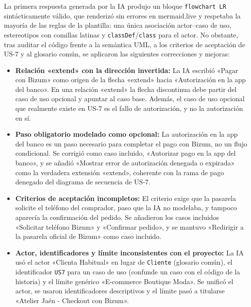 La primera respuesta generada por la IA produjo un bloque \texttt{flowchart LR} sintácticamente válido, que renderizó sin errores en mermaid.live y respetaba la mayoría de las reglas de la plantilla: una única asociación actor--caso de uso, estereotipos con comillas latinas y \texttt{classDef}/\texttt{class} para el actor. No obstante, tras auditar el código frente a la semántica UML, a los criterios de aceptación de US-7 y al glosario común, se aplicaron las siguientes correcciones y mejoras:
\begin{itemize}[leftmargin=*,nosep]
\item \textbf{Relación «extend» con la dirección invertida:} La IA escribió «Pagar con Bizum» como origen de la flecha «extend» hacia «Autorización en la app del banco». En una relación «extend» la flecha discontinua debe partir del caso de uso opcional y apuntar al caso base. Además, el caso de uso opcional que realmente existe en US-7 es el fallo de autorización, y no la autorización en sí.
\item \textbf{Paso obligatorio modelado como opcional:} La autorización en la app del banco es un paso necesario para completar el pago con Bizum, no un flujo condicional. Se corrigió como caso incluido, «Autorizar pago en la app del banco», y se añadió «Mostrar error de autorización denegada o expirada» como la verdadera extensión «extend», coherente con la rama de pago denegado del diagrama de secuencia de US-7.
\item \textbf{Criterios de aceptación incompletos:} El criterio exige que la pasarela solicite el teléfono del comprador, paso que la IA no modelaba, y tampoco aparecía la confirmación del pedido. Se añadieron los casos incluidos «Solicitar teléfono Bizum» y «Confirmar pedido», y se mantuvo «Redirigir a la pasarela oficial de Bizum» como caso incluido.
\item \textbf{Actor, identificadores y límite inconsistentes con el proyecto:} La IA usó el actor «Clienta Habitual» en lugar de \texttt{Cliente} (glosario común), el identificador \texttt{US7} para un caso de uso (confunde un caso con el código de la historia) y el límite genérico «E-commerce Boutique Moda». Se unificó el actor, se usaron identificadores descriptivos y el límite pasó a titularse «Atelier Jaén - Checkout con Bizum».
\end{itemize}
